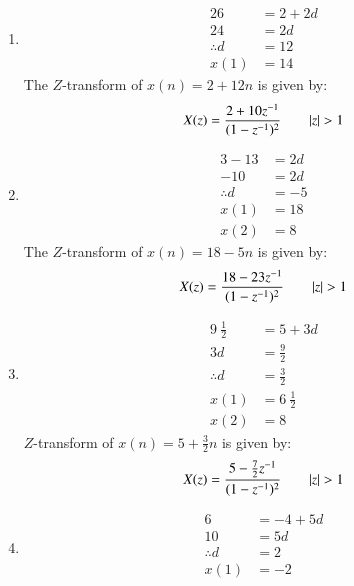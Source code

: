 \documentclass[journal,12pt,twocolumn]{IEEEtran}
\theoremstyle{remark}
\begin{document}
\begin{center}
\begin{enumerate}
    \item  
     \begin{align}
          26&=2+2d\\
        24&=2d \\
        \therefore d&=12\\
         x(1)&=14
     \end{align}
     The $Z$-transform of $x(n) = 2 + 12n$ is given by:
     \begin{align}
    X(z)&=\frac{2+{10z^{-1}}}{(1-{z^{-1}})^2} \qquad|z|>1  \notag\\
     \end{align}     
     \item       
      \begin{align}
         3-13&=2d\\
           -10&=2d\\
           \therefore d&=-5\\
            x(1)&=18\\
            x(2)&=8
      \end{align}
     The $Z$-transform of $x(n) = 18 - 5n$ is given by:
\begin{align}
    &X(z)=\frac{18-{23z^{-1}}}{(1-{z^{-1}})^2} \qquad  |z|>1  \notag\\
\end{align}
       \item    
     \begin{align}
           9\ \frac{1}{2}\ &=5+3d \\
           3d&=\frac{9}{2}\\
           \therefore d&=\frac{3}{2}\ \\ 
          x(1)&=6\ \frac{1}{2}\\
          x(2)&=8
     \end{align}
     $Z$-transform of $x(n) = 5 + \frac{3}{2}n$ is given by:
\begin{align}
    &X(z)=\frac{5-\frac{7}{2}{z^{-1}}}{(1-{z^{-1}})^2} \qquad |z|>1 \notag\\
\end{align}
      \item       
    \begin{align}
     6&=-4+5d\\
     10&=5d\\
     \therefore d&=2\\
          x(1)&=-2\\

\end{align}
\end{enumerate}
\end{center}
\end{document}
